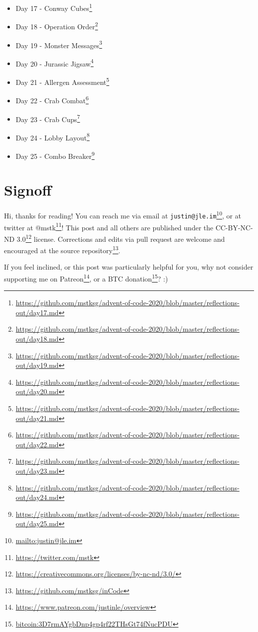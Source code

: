\documentclass[]{article}
\renewcommand{\href}[2]{#2\footnote{\url{#1}}}
\begin{document}
\begin{itemize}
  \href{https://github.com/mstksg/advent-of-code-2020/blob/master/reflections-out/day16.md}{Day
  16 - Ticket Translation}
\item
  \href{https://github.com/mstksg/advent-of-code-2020/blob/master/reflections-out/day17.md}{Day
  17 - Conway Cubes}
\item
  \href{https://github.com/mstksg/advent-of-code-2020/blob/master/reflections-out/day18.md}{Day
  18 - Operation Order}
\item
  \href{https://github.com/mstksg/advent-of-code-2020/blob/master/reflections-out/day19.md}{Day
  19 - Monster Messages}
\item
  \href{https://github.com/mstksg/advent-of-code-2020/blob/master/reflections-out/day20.md}{Day
  20 - Jurassic Jigsaw}
\item
  \href{https://github.com/mstksg/advent-of-code-2020/blob/master/reflections-out/day21.md}{Day
  21 - Allergen Assessment}
\item
  \href{https://github.com/mstksg/advent-of-code-2020/blob/master/reflections-out/day22.md}{Day
  22 - Crab Combat}
\item
  \href{https://github.com/mstksg/advent-of-code-2020/blob/master/reflections-out/day23.md}{Day
  23 - Crab Cups}
\item
  \href{https://github.com/mstksg/advent-of-code-2020/blob/master/reflections-out/day24.md}{Day
  24 - Lobby Layout}
\item
  \href{https://github.com/mstksg/advent-of-code-2020/blob/master/reflections-out/day25.md}{Day
  25 - Combo Breaker}
\end{itemize}

\hypertarget{signoff}{%
\section{Signoff}\label{signoff}}

Hi, thanks for reading! You can reach me via email at
\href{mailto:justin@jle.im}{\nolinkurl{justin@jle.im}}, or at twitter at
\href{https://twitter.com/mstk}{@mstk}! This post and all others are published
under the \href{https://creativecommons.org/licenses/by-nc-nd/3.0/}{CC-BY-NC-ND
3.0} license. Corrections and edits via pull request are welcome and encouraged
at \href{https://github.com/mstksg/inCode}{the source repository}.

If you feel inclined, or this post was particularly helpful for you, why not
consider \href{https://www.patreon.com/justinle/overview}{supporting me on
Patreon}, or a \href{bitcoin:3D7rmAYgbDnp4gp4rf22THsGt74fNucPDU}{BTC donation}?
:)
\end{document}

